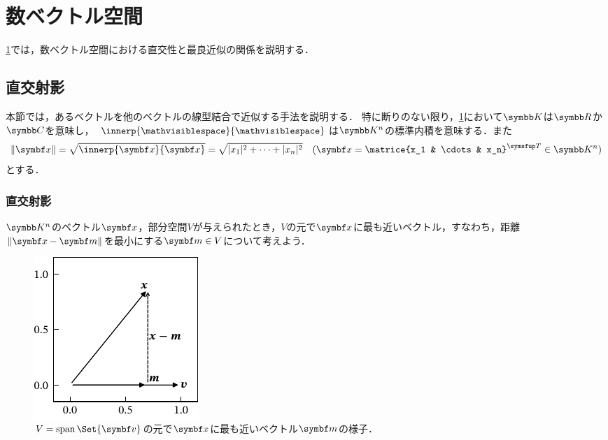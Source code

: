 \documentclass[../../main]{subfiles}
\begin{document}
\chapter{数ベクトル空間}
\label{chapter:numerical_vector_space}

\begin{lead}
  \cref{chapter:numerical_vector_space}では，数ベクトル空間における直交性と最良近似の関係を説明する．
\end{lead}

\section{直交射影}

本節では，あるベクトルを他のベクトルの線型結合で近似する手法を説明する．
特に断りのない限り，\cref{chapter:numerical_vector_space}において\(\numset{K}\)は\(\numset{R}\)か\(\numset{C}\)を意味し，
\(\innerp{\holder}{\holder}\)は\(\numset{K}^n\)の標準内積を意味する．また
\[
  \vnorm{\vect{x}} = \sqrt{\innerp{\vect{x}}{\vect{x}}}
  = \sqrt{\abs{x_1}^2+\dots+\abs{x_n}^2}
  \quad(\vect{x}=\trps{\matrice{x_1 & \cdots & x_n}}\in\numset{K}^n)
\]
とする\indexsymbol{\(\vnorm{\holder}\)}．

\subsection{直交射影}

\(\numset{K}^n\)のベクトル\(\vect{x}\)，部分空間\(V\)が与えられたとき，\(V\)の元で\(\vect{x}\)に最も近いベクトル，すなわち，距離\(\vnorm{\vect{x}-\vect{m}}\)を最小にする\(\vect{m}\in V\)について考えよう．

\begin{figure}[htbp]
  \centering
  \includegraphics{proj2d.pdf}
  \caption{\(V=\spannedby\Set{\vect{v}}\)の元で\(\vect{x}\)に最も近いベクトル\(\vect{m}\)の様子．}
  \label{figure:proj2d}
\end{figure}
\end{document}
